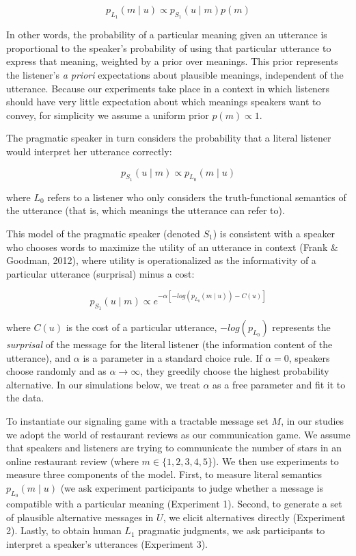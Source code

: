 \documentclass[10pt, letterpaper]{article}
\begin{document}
\[p_{L_1}(m \mid u) \propto p_{S_1} (u \mid m) p(m) \label{eq:rsa}\]

\noindent In other words, the probability of a particular meaning given
an utterance is proportional to the speaker's probability of using that
particular utterance to express that meaning, weighted by a prior over
meanings. This prior represents the listener's \emph{a priori}
expectations about plausible meanings, independent of the utterance.
Because our experiments take place in a context in which listeners
should have very little expectation about which meanings speakers want
to convey, for simplicity we assume a uniform prior \(p(m) \propto 1\).

The pragmatic speaker in turn considers the probability that a literal
listener would interpret her utterance correctly:

\[p_{S_1}(u \mid m) \propto p_{L_0} (m \mid u)\]

\noindent where \(L_0\) refers to a listener who only considers the
truth-functional semantics of the utterance (that is, which meanings the
utterance can refer to).

This model of the pragmatic speaker (denoted \(S_1\)) is consistent with
a speaker who chooses words to maximize the utility of an utterance in
context (Frank \& Goodman, 2012), where utility is operationalized as
the informativity of a particular utterance (surprisal) minus a cost:

\[p_{S_1}(u \mid m) \propto e^{-\alpha[-log(p_{L_0}(m \mid u)) - C(u)]}\]

\noindent where \(C(u)\) is the cost of a particular utterance,
\(-log(p_{L_0})\) represents the \emph{surprisal} of the message for the
literal listener (the information content of the utterance), and
\(\alpha\) is a parameter in a standard choice rule. If \(\alpha=0\),
speakers choose randomly and as \(\alpha \rightarrow \infty\), they
greedily choose the highest probability alternative. In our simulations
below, we treat \(\alpha\) as a free parameter and fit it to the data.

To instantiate our signaling game with a tractable message set \(M\), in
our studies we adopt the world of restaurant reviews as our
communication game. We assume that speakers and listeners are trying to
communicate the number of stars in an online restaurant review (where
\(m \in \{1, 2, 3, 4, 5\}\)). We then use experiments to measure three
components of the model. First, to measure literal semantics
\({p_{L_0} (m \mid u)}\) (we ask experiment participants to judge
whether a message is compatible with a particular meaning (Experiment
1). Second, to generate a set of plausible alternative messages in
\(U\), we elicit alternatives directly (Experiment 2). Lastly, to obtain
human \(L_1\) pragmatic judgments, we ask participants to interpret a
speaker's utterances (Experiment 3).
\end{document}
